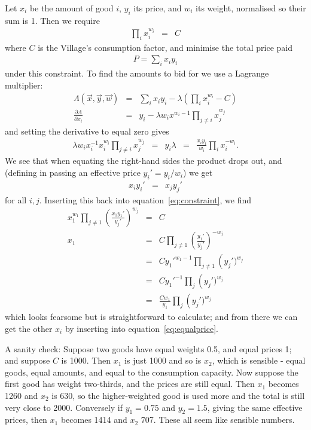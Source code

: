 Let $x_i$ be the amount of good $i$, $y_i$ its price, and $w_i$ its
weight, normalised so their sum is 1. Then we require
\begin{eqnarray}
\label{eq:constraint}
\prod\limits_i x_i^{w_i} &=& C
\end{eqnarray}
where $C$ is the Village's consumption factor, and minimise the total
price paid
\begin{eqnarray*}
P = \sum\limits_i x_iy_i
\end{eqnarray*}
under this constraint. To find the amounts to bid for we use a
Lagrange multiplier:
\begin{eqnarray*}
\Lambda(\vec x, \vec y, \vec w) &=& \sum\limits_i x_iy_i - \lambda\left(\prod\limits_i x_i^{w_i} - C\right)\\
\frac{\partial\Lambda}{\partial x_i} &=& y_i - \lambda w_ix^{w_i-1}\prod\limits_{j\ne i} x_j^{w_j}
\end{eqnarray*}
and setting the derivative to equal zero gives
\begin{eqnarray*}
\lambda w_ix_i^{-1}x_i^{w_i}\prod\limits_{j\ne i} x_j^{w_j} &=& y_i
\lambda &=& \frac{x_iy_i}{w_i}\prod\limits_i x_i^{-w_i}.
\end{eqnarray*}
We see that when equating the right-hand sides
the product drops out, and (defining in passing an effective price
$y_i'=y_i/w_i$) we get
\begin{eqnarray}
\label{eq:equalprice}
x_iy_i' &=& x_jy_j'
\end{eqnarray}
for all $i, j$. Inserting this back into equation~\ref{eq:constraint},
we find
\begin{eqnarray}
x_1^{w_1}\prod\limits_{j\ne 1} \left(\frac{x_1y_1'}{y_j'}\right)^{w_j} &=& C\\
x_1 &=& C \prod\limits_{j\ne 1}\left(\frac{y_1'}{y_j'}\right)^{-w_j} \\
\label{eq:amount}
    &=& Cy_1'^{w_1-1} \prod\limits_{j\ne 1}\left(y_j')^{w_j}\\
    &=& Cy_1'^{-1} \prod\limits_{j}\left(y_j')^{w_j}\\
    &=& \frac{Cw_1}{y_1} \prod\limits_{j}\left(y_j')^{w_j}
\end{eqnarray}
which looks fearsome but is straightforward to calculate; and from
there we can get the other $x_i$ by inserting into
equation~\ref{eq:equalprice}.

A sanity check: Suppose two goods have equal weights 0.5, and equal
prices 1; and suppose $C$ is 1000. Then $x_1$ is just 1000 and so is
$x_2$, which is sensible - equal goods, equal amounts, and equal to
the consumption capacity. Now suppose the first good has weight
two-thirds, and the prices are still equal. Then $x_1$ becomes 1260
and $x_2$ is 630, so the higher-weighted good is used more and the
total is still very close to 2000. Conversely if $y_1=0.75$ and
$y_2=1.5$, giving the same effective prices, then $x_1$ becomes 1414
and $x_2$ 707. These all seem like sensible numbers.

